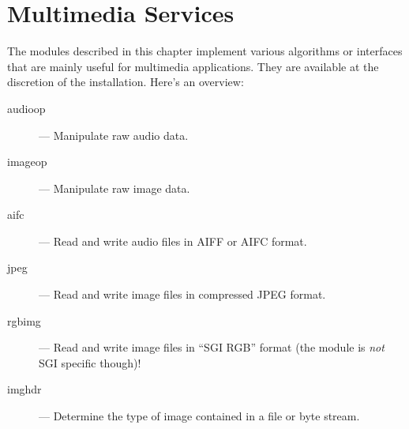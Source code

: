 \chapter{Multimedia Services}

The modules described in this chapter implement various algorithms or
interfaces that are mainly useful for multimedia applications.  They
are available at the discretion of the installation.  Here's an overview:

\begin{description}

\item[audioop]
--- Manipulate raw audio data.

\item[imageop]
--- Manipulate raw image data.

\item[aifc]
--- Read and write audio files in AIFF or AIFC format.

\item[jpeg]
--- Read and write image files in compressed JPEG format.

\item[rgbimg]
--- Read and write image files in ``SGI RGB'' format (the module is
\emph{not} SGI specific though)!

\item[imghdr]
--- Determine the type of image contained in a file or byte stream.

\end{description}

